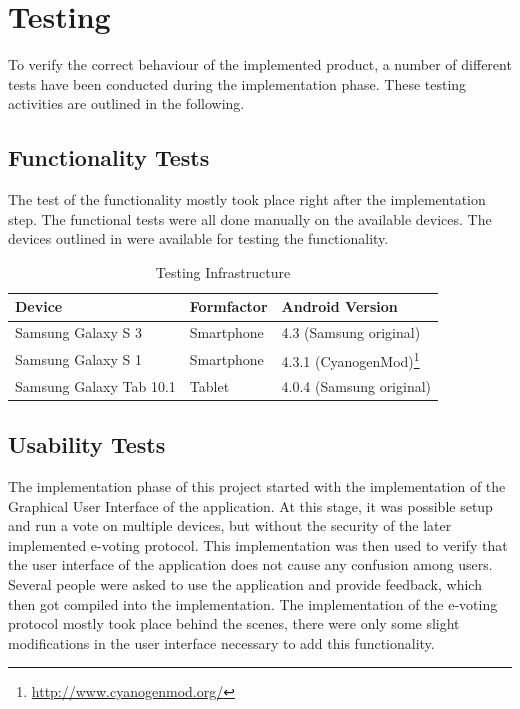 \documentclass[numbers=noenddot, abstract=on, a4paper, headsepline,
footsepline, oneside, draft=off]{scrreprt}
\begin{document}
\section{Testing}
\label{sec:testing}
To verify the correct behaviour of the implemented product, a number of
different tests have been conducted during the implementation phase. These
testing activities are outlined in the following.

\subsection{Functionality Tests}
\label{sec:functionalitytests}
The test of the functionality mostly took place right after the implementation
step. The functional tests were all done manually on the available devices. The
devices outlined in  were available for testing the
functionality.

\begin{table}[htbp]
	\centering
	\renewcommand{\arraystretch}{1.4}
	\begin{minipage}{\linewidth}
	\begin{tabularx}{\textwidth}{lll}
		\toprule
		\textbf{Device}	&  \textbf{Formfactor} & \textbf{Android Version} 	\\
		\midrule
		Samsung Galaxy S 3		& Smartphone	& 4.3 (Samsung original)	\\
		Samsung Galaxy S 1  	& Smartphone	& 4.3.1
		(CyanogenMod)\footnote{\url{http://www.cyanogenmod.org/}}		\\
		Samsung Galaxy Tab 10.1	& Tablet		& 4.0.4 (Samsung original)	\\
		\bottomrule
	\end{tabularx}
	\end{minipage}
	\renewcommand{\arraystretch}{1}
	\caption{Testing Infrastructure}
	\label{tab:testinginfrastructure}
\end{table}

\subsection{Usability Tests}
\label{sec:usabilitytests}
The implementation phase of this project started with the implementation of the
Graphical User Interface of the application. At this stage, it was possible
setup and run a vote on multiple devices, but without the security of the later
implemented e-voting protocol. This implementation was then used to verify that
the user interface of the application does not cause any confusion among users.
Several people were asked to use the application and provide feedback, which
then got compiled into the implementation. The implementation of the e-voting
protocol mostly took place behind the scenes, there were only some slight
modifications in the user interface necessary to add this functionality.
\end{document}
